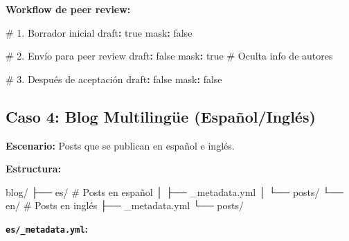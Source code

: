 \documentclass[
  doc,
  floatsintext,
  longtable,
  a4paper,
  nolmodern,
  notxfonts,
  notimes,
  12pt,
  colorlinks=true,linkcolor=blue,citecolor=blue,urlcolor=blue]{apa7}
\newenvironment{Shaded}{\begin{snugshade}}{\end{snugshade}}
\newcommand{\AttributeTok}[1]{\textcolor[rgb]{0.40,0.45,0.13}{#1}}
\newcommand{\CharTok}[1]{\textcolor[rgb]{0.13,0.47,0.30}{#1}}
\newcommand{\CommentTok}[1]{\textcolor[rgb]{0.37,0.37,0.37}{#1}}
\newcommand{\ExtensionTok}[1]{\textcolor[rgb]{0.00,0.23,0.31}{#1}}
\newcommand{\FunctionTok}[1]{\textcolor[rgb]{0.28,0.35,0.67}{#1}}
\newcommand{\KeywordTok}[1]{\textcolor[rgb]{0.00,0.23,0.31}{\textbf{#1}}}
\newcommand{\NormalTok}[1]{\textcolor[rgb]{0.00,0.23,0.31}{#1}}
\begin{document}
\textbf{Workflow de peer review:}

\begin{Shaded}
\begin{Highlighting}[]
\CommentTok{\# 1. Borrador inicial}
\FunctionTok{draft}\KeywordTok{:}\AttributeTok{ }\CharTok{true}
\FunctionTok{mask}\KeywordTok{:}\AttributeTok{ }\CharTok{false}

\CommentTok{\# 2. Envío para peer review}
\FunctionTok{draft}\KeywordTok{:}\AttributeTok{ }\CharTok{false}
\FunctionTok{mask}\KeywordTok{:}\AttributeTok{ }\CharTok{true}\CommentTok{                  \# Oculta info de autores}

\CommentTok{\# 3. Después de aceptación}
\FunctionTok{draft}\KeywordTok{:}\AttributeTok{ }\CharTok{false}
\FunctionTok{mask}\KeywordTok{:}\AttributeTok{ }\CharTok{false}
\end{Highlighting}
\end{Shaded}

\subsection{Caso 4: Blog Multilingüe
(Español/Inglés)}\label{caso-4-blog-multilinguxfce-espauxf1olingluxe9s}

\textbf{Escenario:} Posts que se publican en español e inglés.

\textbf{Estructura:}

\begin{Shaded}
\begin{Highlighting}[]
\ExtensionTok{blog/}
\ExtensionTok{├──}\NormalTok{ es/                     }\CommentTok{\# Posts en español}
\ExtensionTok{│}\NormalTok{   ├── \_metadata.yml}
\ExtensionTok{│}\NormalTok{   └── posts/}
\ExtensionTok{└──}\NormalTok{ en/                     }\CommentTok{\# Posts en inglés}
    \ExtensionTok{├──}\NormalTok{ \_metadata.yml}
    \ExtensionTok{└──}\NormalTok{ posts/}
\end{Highlighting}
\end{Shaded}

\textbf{\texttt{es/\_metadata.yml}:}
\end{document}
